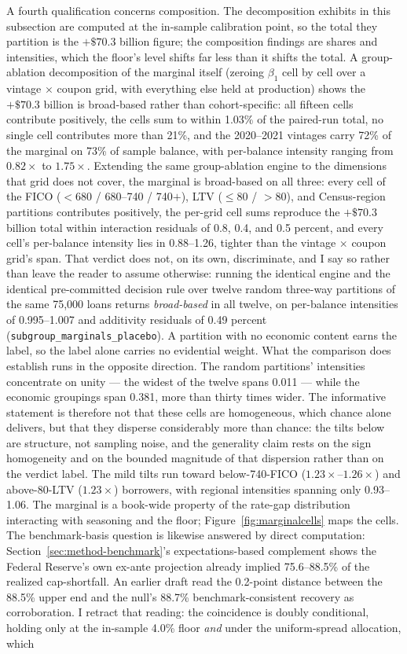 \documentclass[12pt]{article}
\begin{document}
A fourth qualification concerns composition. The decomposition exhibits in this subsection are computed at the in-sample calibration point, so the total they partition is the $+\$70.3$ billion figure; the composition findings are shares and intensities, which the floor's level shifts far less than it shifts the total. A group-ablation decomposition of the marginal itself (zeroing $\beta_1$ cell by cell over a vintage $\times$ coupon grid, with everything else held at production) shows the $+\$70.3$ billion is broad-based rather than cohort-specific: all fifteen cells contribute positively, the cells sum to within 1.03\% of the paired-run total, no single cell contributes more than 21\%, and the 2020--2021 vintages carry 72\% of the marginal on 73\% of sample balance, with per-balance intensity ranging from $0.82\times$ to $1.75\times$. Extending the same group-ablation engine to the dimensions that grid does not cover, the marginal is broad-based on all three: every cell of the FICO ($<$680 / 680--740 / 740$+$), LTV ($\leq$80 / $>$80), and Census-region partitions contributes positively, the per-grid cell sums reproduce the $+\$70.3$ billion total within interaction residuals of 0.8, 0.4, and 0.5 percent, and every cell's per-balance intensity lies in 0.88--1.26, tighter than the vintage $\times$ coupon grid's span. That verdict does not, on its own, discriminate, and I say so rather than leave the reader to assume otherwise: running the identical engine and the identical pre-committed decision rule over twelve random three-way partitions of the same 75,000 loans returns \emph{broad-based} in all twelve, on per-balance intensities of 0.995--1.007 and additivity residuals of 0.49 percent (\texttt{subgroup\_marginals\_placebo}). A partition with no economic content earns the label, so the label alone carries no evidential weight. What the comparison does establish runs in the opposite direction. The random partitions' intensities concentrate on unity --- the widest of the twelve spans 0.011 --- while the economic groupings span 0.381, more than thirty times wider. The informative statement is therefore not that these cells are homogeneous, which chance alone delivers, but that they disperse considerably more than chance: the tilts below are structure, not sampling noise, and the generality claim rests on the sign homogeneity and on the bounded magnitude of that dispersion rather than on the verdict label. The mild tilts run toward below-740-FICO ($1.23\times$--$1.26\times$) and above-80-LTV ($1.23\times$) borrowers, with regional intensities spanning only 0.93--1.06. The marginal is a book-wide property of the rate-gap distribution interacting with seasoning and the floor; Figure~\ref{fig:marginalcells} maps the cells. The benchmark-basis question is likewise answered by direct computation: Section~\ref{sec:method-benchmark}'s expectations-based complement shows the Federal Reserve's own ex-ante projection already implied 75.6--88.5\% of the realized cap-shortfall. An earlier draft read the 0.2-point distance between the 88.5\% upper end and the null's 88.7\% benchmark-consistent recovery as corroboration. I retract that reading: the coincidence is doubly conditional, holding only at the in-sample 4.0\% floor \emph{and} under the uniform-spread allocation, which 
\end{document}
